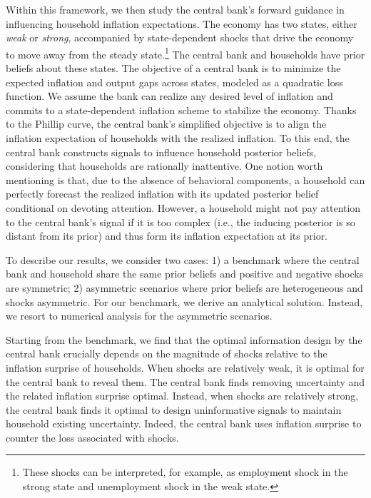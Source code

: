 \documentclass[12pt,a4paper]{article}
\begin{document}
Within this framework, we then study the central bank's forward guidance in influencing household inflation expectations. The economy has two states, either \textit{weak} or \textit{strong}, accompanied by state-dependent shocks that drive the economy to move away from the steady state.\footnote{These shocks can be interpreted, for example, as employment shock in the strong state and unemployment shock in the weak state.} The central bank and households have prior beliefs about these states. The objective of a central bank is to minimize the expected inflation and output gaps across states, modeled as a quadratic loss function. We assume the bank can realize any desired level of inflation and commits to a state-dependent inflation scheme to stabilize the economy. Thanks to the Phillip curve, the central bank's simplified objective is to align the inflation expectation of households with the realized inflation. To this end, the central bank constructs signals to influence household posterior beliefs, considering that households are rationally inattentive. One notion worth mentioning is that, due to the absence of behavioral components, a household can perfectly forecast the realized inflation with its updated posterior belief conditional on devoting attention. However, a household might not pay attention to the central bank's signal if it is too complex (i.e., the inducing posterior is so distant from its prior) and thus form its inflation expectation at its prior.

To describe our results, we consider two cases: 1) a benchmark where the central bank and household share the same prior beliefs and positive and negative shocks are symmetric; 2) asymmetric scenarios where prior beliefs are heterogeneous and shocks asymmetric. For our benchmark, we derive an analytical solution. Instead, we resort to numerical analysis for the asymmetric scenarios. 

Starting from the benchmark, we find that the optimal information design by the central bank crucially depends on the magnitude of shocks relative to the inflation surprise of households. When shocks are relatively weak, it is optimal for the central bank to reveal them. The central bank finds removing uncertainty and the related inflation surprise optimal. Instead, when shocks are relatively strong, the central bank finds it optimal to design uninformative signals to maintain household existing uncertainty. Indeed, the central bank uses inflation surprise to counter the loss associated with shocks. 
\end{document}

